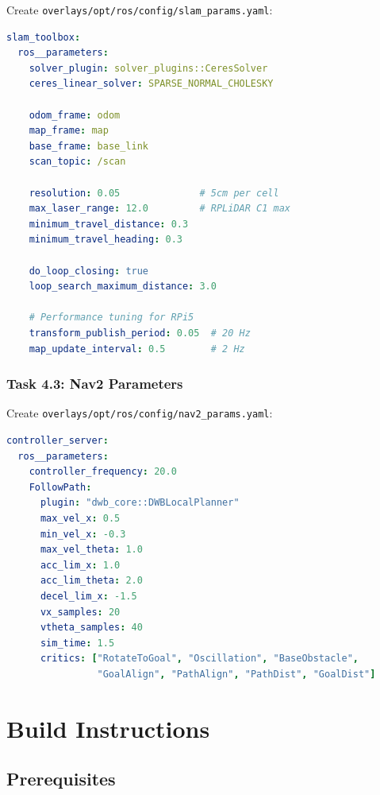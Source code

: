 Create \texttt{overlays/opt/ros/config/slam\_params.yaml}:

\begin{lstlisting}[language=yaml, caption=slam\_params.yaml]
slam_toolbox:
  ros__parameters:
    solver_plugin: solver_plugins::CeresSolver
    ceres_linear_solver: SPARSE_NORMAL_CHOLESKY

    odom_frame: odom
    map_frame: map
    base_frame: base_link
    scan_topic: /scan

    resolution: 0.05              # 5cm per cell
    max_laser_range: 12.0         # RPLiDAR C1 max
    minimum_travel_distance: 0.3
    minimum_travel_heading: 0.3

    do_loop_closing: true
    loop_search_maximum_distance: 3.0

    # Performance tuning for RPi5
    transform_publish_period: 0.05  # 20 Hz
    map_update_interval: 0.5        # 2 Hz
\end{lstlisting}

\subsubsection{Task 4.3: Nav2 Parameters}

Create \texttt{overlays/opt/ros/config/nav2\_params.yaml}:

\begin{lstlisting}[language=yaml, caption=nav2\_params.yaml (DWA Controller)]
controller_server:
  ros__parameters:
    controller_frequency: 20.0
    FollowPath:
      plugin: "dwb_core::DWBLocalPlanner"
      max_vel_x: 0.5
      min_vel_x: -0.3
      max_vel_theta: 1.0
      acc_lim_x: 1.0
      acc_lim_theta: 2.0
      decel_lim_x: -1.5
      vx_samples: 20
      vtheta_samples: 40
      sim_time: 1.5
      critics: ["RotateToGoal", "Oscillation", "BaseObstacle",
                "GoalAlign", "PathAlign", "PathDist", "GoalDist"]
\end{lstlisting}

\section{Build Instructions}

\subsection{Prerequisites}

